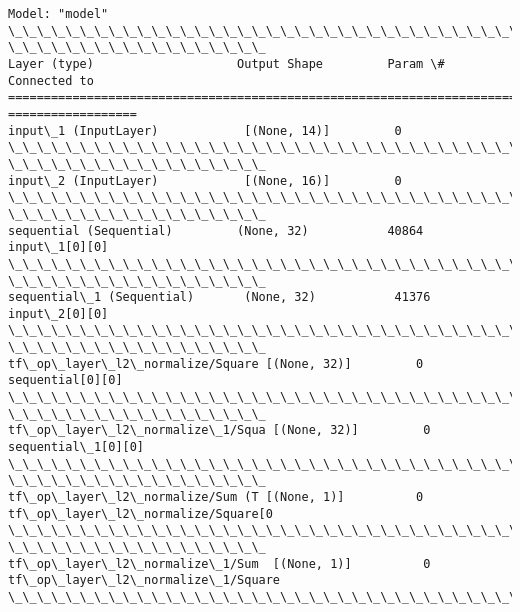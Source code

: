 \documentclass[11pt]{article}
\begin{document}
    \begin{Verbatim}[commandchars=\\\{\}]
Model: "model"
\_\_\_\_\_\_\_\_\_\_\_\_\_\_\_\_\_\_\_\_\_\_\_\_\_\_\_\_\_\_\_\_\_\_\_\_\_\_\_\_\_\_\_\_\_\_\_\_\_\_\_\_\_\_\_\_\_\_\_\_\_\_\_\_\_\_\_\_\_\_\_\_\_\_\_\_\_\_\_\_
\_\_\_\_\_\_\_\_\_\_\_\_\_\_\_\_\_\_
Layer (type)                    Output Shape         Param \#     Connected to
================================================================================
==================
input\_1 (InputLayer)            [(None, 14)]         0
\_\_\_\_\_\_\_\_\_\_\_\_\_\_\_\_\_\_\_\_\_\_\_\_\_\_\_\_\_\_\_\_\_\_\_\_\_\_\_\_\_\_\_\_\_\_\_\_\_\_\_\_\_\_\_\_\_\_\_\_\_\_\_\_\_\_\_\_\_\_\_\_\_\_\_\_\_\_\_\_
\_\_\_\_\_\_\_\_\_\_\_\_\_\_\_\_\_\_
input\_2 (InputLayer)            [(None, 16)]         0
\_\_\_\_\_\_\_\_\_\_\_\_\_\_\_\_\_\_\_\_\_\_\_\_\_\_\_\_\_\_\_\_\_\_\_\_\_\_\_\_\_\_\_\_\_\_\_\_\_\_\_\_\_\_\_\_\_\_\_\_\_\_\_\_\_\_\_\_\_\_\_\_\_\_\_\_\_\_\_\_
\_\_\_\_\_\_\_\_\_\_\_\_\_\_\_\_\_\_
sequential (Sequential)         (None, 32)           40864       input\_1[0][0]
\_\_\_\_\_\_\_\_\_\_\_\_\_\_\_\_\_\_\_\_\_\_\_\_\_\_\_\_\_\_\_\_\_\_\_\_\_\_\_\_\_\_\_\_\_\_\_\_\_\_\_\_\_\_\_\_\_\_\_\_\_\_\_\_\_\_\_\_\_\_\_\_\_\_\_\_\_\_\_\_
\_\_\_\_\_\_\_\_\_\_\_\_\_\_\_\_\_\_
sequential\_1 (Sequential)       (None, 32)           41376       input\_2[0][0]
\_\_\_\_\_\_\_\_\_\_\_\_\_\_\_\_\_\_\_\_\_\_\_\_\_\_\_\_\_\_\_\_\_\_\_\_\_\_\_\_\_\_\_\_\_\_\_\_\_\_\_\_\_\_\_\_\_\_\_\_\_\_\_\_\_\_\_\_\_\_\_\_\_\_\_\_\_\_\_\_
\_\_\_\_\_\_\_\_\_\_\_\_\_\_\_\_\_\_
tf\_op\_layer\_l2\_normalize/Square [(None, 32)]         0
sequential[0][0]
\_\_\_\_\_\_\_\_\_\_\_\_\_\_\_\_\_\_\_\_\_\_\_\_\_\_\_\_\_\_\_\_\_\_\_\_\_\_\_\_\_\_\_\_\_\_\_\_\_\_\_\_\_\_\_\_\_\_\_\_\_\_\_\_\_\_\_\_\_\_\_\_\_\_\_\_\_\_\_\_
\_\_\_\_\_\_\_\_\_\_\_\_\_\_\_\_\_\_
tf\_op\_layer\_l2\_normalize\_1/Squa [(None, 32)]         0
sequential\_1[0][0]
\_\_\_\_\_\_\_\_\_\_\_\_\_\_\_\_\_\_\_\_\_\_\_\_\_\_\_\_\_\_\_\_\_\_\_\_\_\_\_\_\_\_\_\_\_\_\_\_\_\_\_\_\_\_\_\_\_\_\_\_\_\_\_\_\_\_\_\_\_\_\_\_\_\_\_\_\_\_\_\_
\_\_\_\_\_\_\_\_\_\_\_\_\_\_\_\_\_\_
tf\_op\_layer\_l2\_normalize/Sum (T [(None, 1)]          0
tf\_op\_layer\_l2\_normalize/Square[0
\_\_\_\_\_\_\_\_\_\_\_\_\_\_\_\_\_\_\_\_\_\_\_\_\_\_\_\_\_\_\_\_\_\_\_\_\_\_\_\_\_\_\_\_\_\_\_\_\_\_\_\_\_\_\_\_\_\_\_\_\_\_\_\_\_\_\_\_\_\_\_\_\_\_\_\_\_\_\_\_
\_\_\_\_\_\_\_\_\_\_\_\_\_\_\_\_\_\_
tf\_op\_layer\_l2\_normalize\_1/Sum  [(None, 1)]          0
tf\_op\_layer\_l2\_normalize\_1/Square
\_\_\_\_\_\_\_\_\_\_\_\_\_\_\_\_\_\_\_\_\_\_\_\_\_\_\_\_\_\_\_\_\_\_\_\_\_\_\_\_\_\_\_\_\_\_\_\_\_\_\_\_\_\_\_\_\_\_\_\_\_\_\_\_\_\_\_\_\_\_\_\_\_\_\_\_\_\_\_\_

\end{Verbatim}
\end{document}
